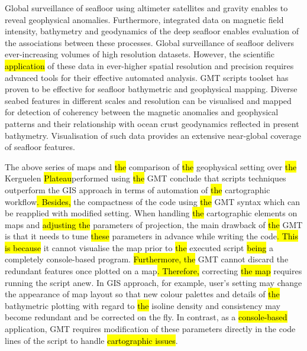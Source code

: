 \documentclass[geomatics,article,submit,pdftex,moreauthors]{Definitions/mdpi}
\begin{document}
Global surveillance of seafloor using altimeter satellites and gravity enables to reveal geophysical anomalies. Furthermore, integrated data on magnetic field intensity, bathymetry and geodynamics of the deep seafloor enables evaluation of the associations between these processes. Global surveillance of seafloor delivers ever-increasing volumes of high resolution datasets. However, the scientific \hl{application} of these data in ever-higher spatial resolution and precision requires advanced tools  for their effective automated analysis. GMT scripts toolset has proven to be effective for seafloor bathymetric and geophysical mapping. Diverse seabed features in different scales and resolution can be visualised and mapped for detection of coherency between the magnetic anomalies and geophysical patterns and their relationship with ocean crust geodynamics reflected in present bathymetry. Visualisation of such data provides an extensive near-global coverage of seafloor features. 

The above series of maps and \hl{the }comparison of \hl{the }geophysical setting over \hl{the }Kerguelen \hl{Plateau}performed using \hl{the }GMT conclude that scripts techniques outperform the GIS approach in terms of automation of \hl{the }cartographic workflow\hl{. Besides, }the compactness of the code using \hl{the }GMT syntax which can be reapplied with modified setting. When handling \hl{the }cartographic elements on maps and \hl{adjusting the }parameters of projection, the main drawback of \hl{the }GMT is that it needs to tune \hl{these }parameters\hl{ }in advance while writing the code\hl{. This is because} it cannot visualise the map prior to \hl{the }executed script \hl{being} a completely console-based program. \hl{Furthermore, the} GMT cannot discard the redundant features once plotted on a map\hl{. Therefore, }correcting \hl{the map }requires running the script anew. In GIS approach, for example, user's setting may change the appearance of map layout so that new colour palettes and details of \hl{the }bathymetric plotting with regard to \hl{the }isoline density and consistency may become redundant and be corrected on the fly. In contrast, as a\hl{ console-based} application, GMT requires modification of these parameters directly in the code lines of the script to handle \hl{cartographic issues}. 


\end{document}
